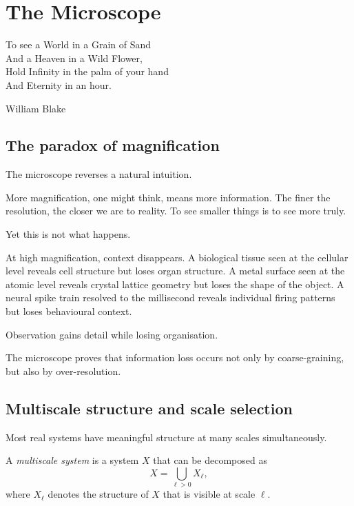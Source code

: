 
\chapter{The Microscope}
\label{ch:microscope}

\epigraph{%
  To see a World in a Grain of Sand\\
  And a Heaven in a Wild Flower,\\
  Hold Infinity in the palm of your hand\\
  And Eternity in an hour.%
}{William Blake}

\section{The paradox of magnification}

The microscope reverses a natural intuition.

More magnification, one might think, means more information.
The finer the resolution, the closer we are to reality.
To see smaller things is to see more truly.

Yet this is not what happens.

At high magnification, context disappears.
A biological tissue seen at the cellular level reveals cell
structure but loses organ structure.
A metal surface seen at the atomic level reveals crystal lattice
geometry but loses the shape of the object.
A neural spike train resolved to the millisecond reveals
individual firing patterns but loses behavioural context.

Observation gains detail while losing organisation.

The microscope proves that information loss occurs not only by
coarse-graining, but also by over-resolution.

\section{Multiscale structure and scale selection}

Most real systems have meaningful structure at many scales
simultaneously.

\begin{definition}
  A \emph{multiscale system} is a system $X$ that can be
  decomposed as
  \[
    X = \bigcup_{\ell > 0} X_\ell,
  \]
  where $X_\ell$ denotes the structure of $X$ that is
  visible at scale $\ell$.
\end{definition}

